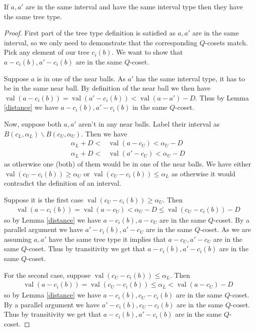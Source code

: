 \documentclass{amsart}
\DeclareMathOperator{\val}{val}
\begin{document}
\begin{Lemma} \label{interval}
	If $a, a'$ are in the same interval and have the same interval type then they have the same tree type.
\end{Lemma}
\begin{proof}
	First part of the tree type definition is satisfied as $a, a'$ are in the same interval,
	so we only need to demonstrate that the corresponding $Q$-cosets match.
	Pick any element of our tree $c_i(b)$.
	We want to show that $a - c_i(b), a' - c_i(b)$ are in the same $Q$-coset.
		
	Suppose $a$ is in one of the near balls.
	As $a'$ has the same interval type, it has to be in the same near ball.
	By definition of the near ball we then have $\val(a - c_i(b)) = \val(a' - c_i(b)) < \val(a - a') - D$.
	Thus by Lemma \ref{distance} we have $a - c_i(b), a' - c_i(b)$ in the same $Q$-coset.
	
	Now, suppose both $a, a'$ aren't in any near balls.
	Label their interval as $B(c_L, \alpha_L) \backslash B(c_U, \alpha_U)$.
	Then we have 
	\begin{align*}
		\alpha_L + D < &\val (a - c_U) < \alpha_U - D \\
		\alpha_L + D < &\val (a' - c_U) < \alpha_U - D
	\end{align*}
	as otherwise one (both) of them would be in one of the near balls.
	We have either $\val(c_U - c_i(b)) \geq \alpha_U$ or $\val(c_U - c_i(b)) \leq \alpha_L$
	as otherwise it would contradict the definition of an interval.
	
	Suppose it is the first case $\val(c_U - c_i(b)) \geq \alpha_U$.
	Then
	\begin{align*}
		 \val(a - c_i(b)) = \val(a - c_U) < \alpha_U - D \leq \val(c_U - c_i(b)) - D
	\end{align*}
	so by Lemma \ref{distance} we have $a - c_i(b), a - c_U$ are in the same $Q$-coset.
	By a parallel argument we have $a' - c_i(b), a' - c_U$ are in the same $Q$-coset.
	As we are assuming $a, a'$ have the same tree type it implies that $a - c_U, a' - c_U$ are in the same $Q$-coset.
	Thus by transitivity we get that $a - c_i(b), a' - c_i(b)$ are in the same $Q$-coset.
	
	For the second case, suppose $\val(c_U - c_i(b)) \leq \alpha_L$.
	Then
	\begin{align*}
		\val(a - c_i(b)) = \val(c_U - c_i(b)) \leq \alpha_L < \val(a - c_U) - D
	\end{align*}
	so by Lemma \ref{distance} we have $a - c_i(b), c_U - c_i(b)$ are in the same $Q$-coset.
	By a parallel argument we have $a' - c_i(b), c_U - c_i(b)$ are in the same $Q$-coset.
	Thus by transitivity we get that $a - c_i(b), a' - c_i(b)$ are in the same $Q$-coset.
\end{proof}
\end{document}
